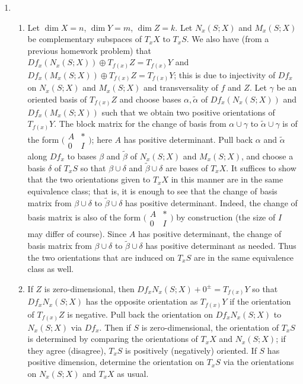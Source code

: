 \documentclass[11pt,leqno]{article}
\theoremstyle{plain}
\theoremstyle{definition}
\numberwithin{equation}{section}
\numberwithin{lem}{section}
\begin{document}
\begin{enumerate}
    \item \begin{enumerate}
        \item Let $\dim X = n$, $\dim Y = m$, $\dim Z = k$. Let $N_x(S;X)$ and $M_x(S;X)$ be complementary subspaces of $T_xX$ to $T_xS$. We also have (from a previous homework problem) that $Df_x(N_x(S;X)) \oplus T_{f(x)}Z = T_{f(x)}Y$ and $Df_x(M_x(S;X)) \oplus T_{f(x)}Z = T_{f(x)}Y$; this is due to injectivity of $Df_x$ on $N_x(S;X)$ and $M_x(S;X)$ and transversality of $f$ and $Z$. Let $\gamma$ be an oriented basis of $T_{f(x)}Z$ and choose bases $\alpha,\tilde\alpha$ of $Df_x(N_x(S;X))$ and $Df_x(M_x(S;X))$ such that we obtain two positive orientations of $T_{f(x)}Y$. The block matrix for the change of basis from $\alpha\cup\gamma$ to $\tilde\alpha\cup\gamma$ is of the form $\big(\!\begin{smallmatrix}
            A & \ast \\ 0 & I
        \end{smallmatrix}\!\big)$; here $A$ has positive determinant. Pull back $\alpha$ and $\tilde\alpha$ along $Df_x$ to bases $\beta$ and $\tilde\beta$ of $N_x(S;X)$ and $M_x(S;X)$, and choose a basis $\delta$ of $T_xS$ so that $\beta\cup\delta$ and $\tilde\beta\cup\delta$ are bases of $T_xX$. It suffices to show that the two orientations given to $T_xX$ in this manner are in the same equivalence class; that is, it is enough to see that the change of basis matrix from $\beta\cup\delta$ to $\tilde\beta\cup\delta$ has positive determinant. Indeed, the change of basis matrix is also of the form $\big(\!\begin{smallmatrix}
            A & \ast \\ 0 & I
        \end{smallmatrix}\!\big)$ by construction (the size of $I$ may differ of course). Since $A$ has positive determinant, the change of basis matrix from $\beta\cup\delta$ to $\tilde\beta\cup\delta$ has positive determinant as needed. Thus the two orientations that are induced on $T_xS$ are in the same equivalence class as well.
        \item If $Z$ is zero-dimensional, then $Df_xN_x(S;X) + 0^\pm = T_{f(x)}Y$ so that $Df_xN_x(S;X)$ has the opposite orientation as $T_{f(x)}Y$ if the orientation of $T_{f(x)}Z$ is negative. Pull back the orientation on $Df_xN_x(S;X)$ to $N_x(S;X)$ via $Df_x$. Then if $S$ is zero-dimensional, the orientation of $T_xS$ is determined by comparing the orientations of $T_xX$ and $N_x(S;X)$; if they agree (disagree), $T_xS$ is positively (negatively) oriented. If $S$ has positive dimension, determine the orientation on $T_xS$ via the orientations on $N_x(S;X)$ and $T_xX$ as usual. 
        

\end{enumerate}
\end{enumerate}
\end{document}
